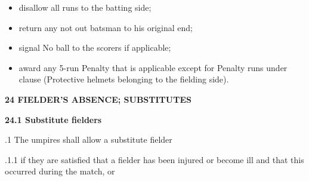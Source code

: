 \documentclass[12pt]{article}
\begin{document}
\vspace{\baselineskip}
\begin{itemize}
	\item {\fontsize{9pt}{10.8pt}\selectfont disallow all runs to the batting side;\par}\par


\vspace{\baselineskip}
	\item {\fontsize{9pt}{10.8pt}\selectfont return any not out batsman to his original end;\par}\par


\vspace{\baselineskip}
	\item {\fontsize{9pt}{10.8pt}\selectfont signal No ball to the scorers if applicable;\par}\par


\vspace{\baselineskip}
	\item {\fontsize{9pt}{10.8pt}\selectfont award any 5-run Penalty that is applicable except for Penalty runs under clause (Protective helmets belonging to the fielding side).\par}
\end{itemize}\par


\vspace{\baselineskip}
{\fontsize{16pt}{19.2pt}\selectfont \textbf{24 FIELDER’S ABSENCE; SUBSTITUTES}\par}\par


\vspace{\baselineskip}
{\fontsize{11pt}{13.2pt}\selectfont \textbf{24.1 \tabto{0.47in} Substitute fielders}\par}\par


\vspace{\baselineskip}
{\fontsize{9pt}{10.8pt}.1 \tabto{0.49in} The umpires shall allow a substitute fielder\par}\par


\vspace{\baselineskip}
\begin{adjustwidth}{1.18in}{0.03in}
{\fontsize{9pt}{10.8pt}.1.1 \tabto{1.17in} if they are satisfied that a fielder has been injured or become ill and that this occurred during the match, or\par}\par

\end{adjustwidth}
\end{document}
